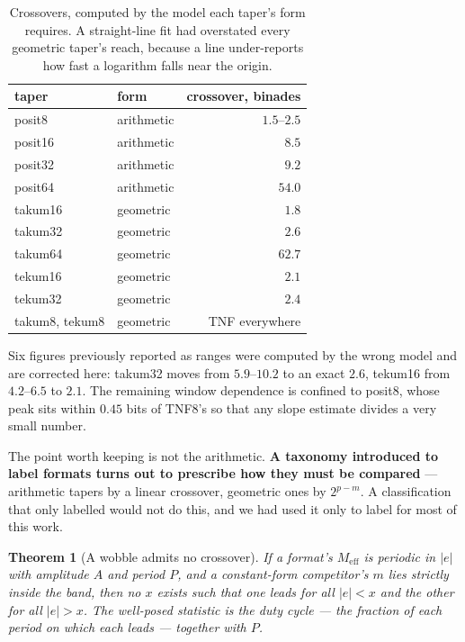 \documentclass[11pt]{article}
\newtheorem{theorem}{Theorem}
\theoremstyle{definition}
\begin{document}
\begin{table}[t]\centering
\caption{Crossovers, computed by the model each taper's form requires. A
straight-line fit had overstated every geometric taper's reach, because a line
under-reports how fast a logarithm falls near the origin.}
\label{tab:crosscorrected}
\begin{tabular}{llr}
\toprule
taper & form & crossover, binades \\
\midrule
posit8 & arithmetic & $1.5$--$2.5$ \\
posit16 & arithmetic & $8.5$ \\
posit32 & arithmetic & $9.2$ \\
posit64 & arithmetic & $54.0$ \\
takum16 & geometric & $\mathbf{1.8}$ \\
takum32 & geometric & $\mathbf{2.6}$ \\
takum64 & geometric & $\mathbf{62.7}$ \\
tekum16 & geometric & $\mathbf{2.1}$ \\
tekum32 & geometric & $\mathbf{2.4}$ \\
takum8, tekum8 & geometric & TNF everywhere \\
\bottomrule
\end{tabular}
\end{table}

Six figures previously reported as ranges were computed by the wrong model and
are corrected here: takum32 moves from $5.9$--$10.2$ to an exact $2.6$, tekum16
from $4.2$--$6.5$ to $2.1$. The remaining window dependence is confined to
posit8, whose peak sits within $0.45$ bits of TNF8's so that any slope estimate
divides a very small number.

The point worth keeping is not the arithmetic. \textbf{A taxonomy introduced to label
formats turns out to prescribe how they must be compared} --- arithmetic tapers
by a linear crossover, geometric ones by $2^{p-m}$. A classification that only
labelled would not do this, and we had used it only to label for most of this
work.



\begin{theorem}[A wobble admits no crossover]
\label{thm:wobblecross}
If a format's $M_{\mathrm{eff}}$ is periodic in $|e|$ with amplitude $A$ and
period $P$, and a constant-form competitor's $m$ lies strictly inside the band,
then no $x$ exists such that one leads for all $|e| < x$ and the other for all
$|e| > x$. The well-posed statistic is the duty cycle --- the fraction of each
period on which each leads --- together with $P$.
\end{theorem}
\end{document}
